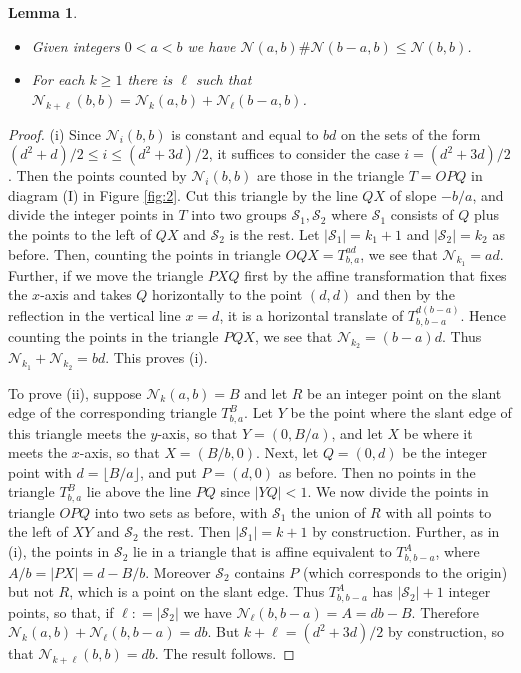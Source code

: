 \documentclass[11pt]{amsart}
\newcommand{\labell}[1] {\label{#1}}
\newcommand{\1}{{{\mathchoice {\rm 1\mskip-4mu l} {\rm 1\mskip-4mu l}
{\rm 1\mskip-4.5mu l} {\rm 1\mskip-5mu l}}}}
\newcommand{\Ss}{{\mathcal S}}
\newcommand{\Nn}{{\mathcal N}}
\newtheorem{lemma}[theorem]{Lemma}
\numberwithin{figure}{section}
\numberwithin{equation}{section}
\begin{document}
  \begin{lemma}\labell{le:hof2}  
  \begin{itemize}\item[(i)] Given integers $0<a<b$ we have $\Nn(a,b)\#\Nn(b-a,b) \le \Nn(b,b)$.
  \item[(ii)]  For each $k\ge 1$ there is $\ell$ such that  $\Nn_{k+\ell}(b,b) = \Nn_k(a,b) + 
  \Nn_\ell(b-a,b)$.
  \end{itemize}\end{lemma}
  \begin{proof} (i) Since $\Nn_i(b,b)$ is constant and equal to $bd$ on the sets of the form  $(d^2+d)/2\le i\le(d^2+3d)/2$, it suffices to consider the case $i = (d^2+3d)/2$.  Then the points counted by $\Nn_i(b,b)$ are those in the triangle $T= OPQ$ in diagram (I) in Figure \ref{fig:2}. Cut this triangle by the 
  line $QX$ of slope $-b/a$, and divide the integer points in $T$ into two groups $\Ss_1,\Ss_2$
  where $\Ss_1$ consists of $Q$ plus the points to the left of $QX$ and $\Ss_2$ is the rest.
  Let $|\Ss_1|=k_1+1$ and $ |\Ss_2|=k_2 $ as before.
  Then, counting the points in triangle $OQX = T_{b,a}^{ad}$,  
  we see that $\Nn_{k_1} = ad$.
  Further, if we move the triangle $PXQ$ first by the affine transformation that fixes the $x$-axis and takes $Q$ horizontally to the point $(d,d)$ and then by the reflection in 
  the vertical line $x=d$, it is a horizontal translate of $T_{b,b-a}^{d(b-a)}$.
  Hence counting the points in the triangle $PQX$,  
  we see that $\Nn_{k_2} = (b-a)d$.  Thus $\Nn_{k_1}+\Nn_{k_2} = bd$. This proves (i).
  
  To prove (ii), suppose $\Nn_k(a,b) = B$ and let $R$ be an integer point on the slant edge of the corresponding triangle $T_{b,a}^B$.  Let $Y$ be the point where the
  slant edge of this triangle meets the $y$-axis, so that $Y = (0,B/a)$, and let $X$ be where it meets the $x$-axis, so that $X = (B/b,0)$.
  Next,  let $Q = (0,d)$ be the integer point with $d=\lfloor B/a\rfloor$, and put $P=(d,0)$ as before.  Then  no points  
  in the triangle $T_{b,a}^B$ lie above the line $PQ$ since $|YQ|<1$.  We now divide
  the points in triangle $OPQ$ into two sets as before, with $\Ss_1$ the union of $R$ with all points to the left of $XY$ and $\Ss_2$ the rest.   
  Then $|\Ss_1|=k+1$ by construction.   Further, as in (i), the points in $\Ss_2$ lie in a triangle that is affine equivalent to $T_{b,b-a}^{A}$, where $A/b =|PX| = d-B/b$.   Moreover $\Ss_2$ contains $P$ (which corresponds to the origin) but not $R$, which is a point on the slant edge.
  Thus  $T_{b,b-a}^{A}$ has $|\Ss_2|+1$ integer points, so that, if $\ell: = |\Ss_2|$ we have $\Nn_\ell(b,b-a) = A=db-B$.  Therefore $\Nn_k(a,b) + \Nn_\ell(b,b-a) = db$.
  But $k+\ell = (d^2+3d)/2$ by construction, so that $\Nn_{k+\ell}(b,b) = db$.
  The result follows.
   \end{proof}
  
\end{document}
